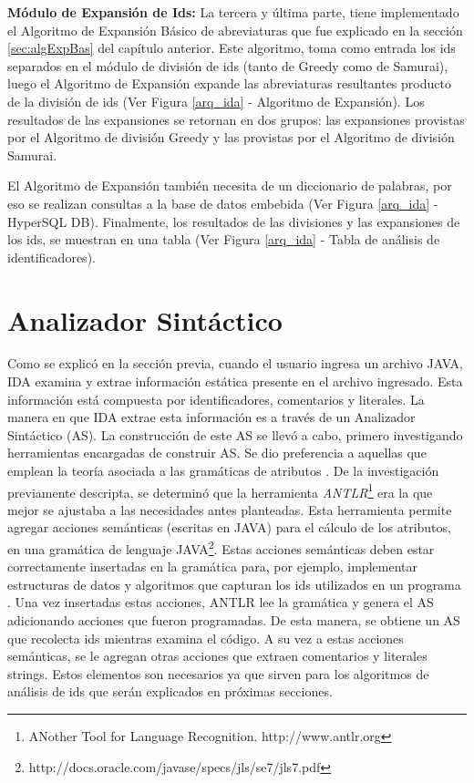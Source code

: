 \textbf{Módulo de Expansión de Ids:} La tercera y última parte, tiene implementado el Algoritmo de Expansión Básico de abreviaturas que fue explicado en la sección \ref{sec:algExpBas} del capítulo anterior.
Este algoritmo, toma como entrada los ids separados en el módulo de división de ids (tanto de Greedy como de Samurai), luego el Algoritmo de Expansión expande las abreviaturas resultantes producto de la división de ids (Ver Figura \ref{arq_ida} - Algoritmo de Expansión). Los resultados de las expansiones se retornan en dos grupos: las expansiones provistas por el Algoritmo de división Greedy y las provistas por el Algoritmo de división Samurai.


El \mbox{Algoritmo} de Expansión también necesita de un diccionario de palabras, por eso se realizan consultas a la base de datos embebida (Ver Figura \ref{arq_ida} - HyperSQL DB). Finalmente, los resultados de las divisiones y las expansiones de los ids, se muestran en una tabla (Ver Figura \ref{arq_ida} - Tabla de análisis de identificadores).

\section{Analizador Sintáctico}

Como se explicó en la sección previa, cuando el usuario ingresa un archivo JAVA, IDA examina y extrae información estática presente en el archivo ingresado. Esta información está compuesta por identificadores, comentarios y literales. La manera en que IDA extrae esta información es a través de un Analizador Sintáctico (AS).
La construcción de este AS se llevó a cabo, primero investigando herramientas encargadas de construir AS. Se dio preferencia a aquellas que emplean la teoría asociada a las gramáticas de atributos \cite{AHUL06}. De la investigación previamente descripta, se determinó que la herramienta \textit{ANTLR}\footnote[1]{ANother Tool for Language Recognition. http://www.antlr.org} era la que mejor se ajustaba a las necesidades antes planteadas. 
Esta herramienta permite agregar acciones semánticas (escritas en JAVA) para el cálculo de los atributos, en una gramática de lenguaje JAVA\footnote[2]{http://docs.oracle.com/javase/specs/jls/se7/jls7.pdf}. Estas acciones semánticas deben estar correctamente insertadas en la gramática para, por ejemplo, implementar estructuras de datos y algoritmos que capturan los ids utilizados en un programa \cite{AAJU83}. Una vez insertadas estas acciones, ANTLR lee la gramática y genera el AS adicionando acciones que fueron programadas. De esta manera, se obtiene un AS que recolecta ids mientras examina el código. A su vez a estas acciones semánticas, se le agregan otras acciones que extraen comentarios y literales strings. Estos elementos son necesarios ya que sirven para los algoritmos de análisis de ids que serán explicados en próximas secciones.

